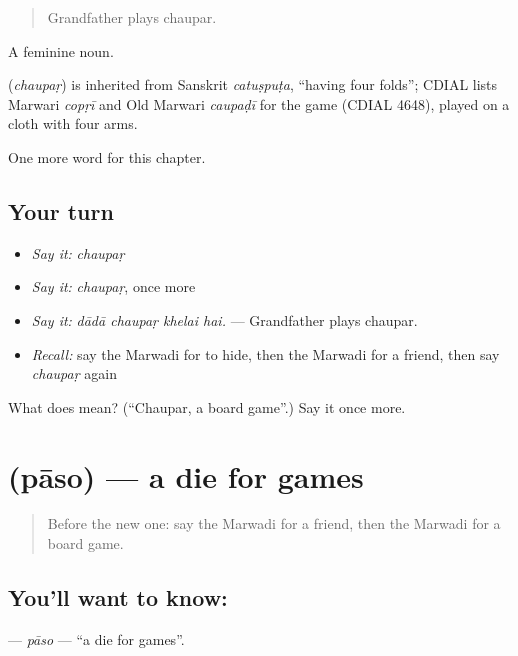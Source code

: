 \begin{quote}
Grandfather plays chaupar.
\end{quote}

A feminine noun.

\begin{cousinweb}
\textbf{} (\emph{chaupaṛ}) is inherited from Sanskrit \emph{catuṣpuṭa}, \textquotedblleft{}having four folds\textquotedblright{}; CDIAL lists Marwari \emph{copṛī} and Old Marwari \emph{caupaḍī} for the game (CDIAL 4648), played on a cloth with four arms.
\end{cousinweb}

\begin{grammarlens}[title={What you've built}]
One more word for this chapter.
\end{grammarlens}

\subsection*{Your turn}
\begin{itemize}
\raggedright
  \item \emph{Say it:} \emph{chaupaṛ}
  \item \emph{Say it:} \emph{chaupaṛ}, once more
  \item \emph{Say it:} \emph{dādā chaupaṛ khelai hai.} — Grandfather plays chaupar.
  \item \emph{Recall:} say the Marwadi for to hide, then the Marwadi for a friend, then say \emph{chaupaṛ} again
\end{itemize}

\begin{tcolorbox}[breakable,colback=teal!4,colframe=teal!35!black,title={Before you move on}]
What does  mean? (\textquotedblleft{}Chaupar, a board game\textquotedblright{}.) Say it once more.
\end{tcolorbox}
\section[\texorpdfstring{\mw{पासो} (pāso)}{पासो (pāso)}]{ (pāso) — a die for games}

\label{lesson:MW-C279-paso}



\begin{quote}
Before the new one: say the Marwadi for a friend, then the Marwadi for a board game.
\end{quote}

\subsection*{You'll want to know: }
\textbf{} — \emph{pāso} — \textquotedblleft{}a die for games\textquotedblright{}.

